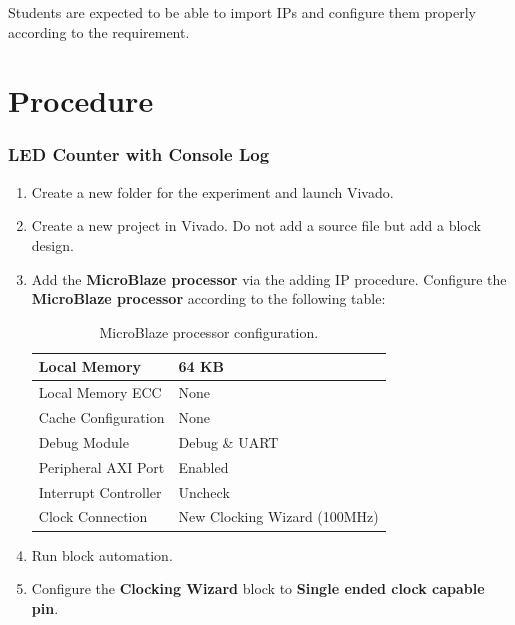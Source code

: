 \documentclass[11pt,letterpaper,titlepage]{article}
\begin{document}
Students are expected to be able to import IPs and configure them properly according to the requirement.

\part{Procedure}

\section{LED Counter with Console Log}

\begin{enumerate}
    \item Create a new folder for the experiment and launch Vivado.
    
    \item Create a new project in Vivado. Do not add a source file but add a block design.
    
    \item Add the \textbf{MicroBlaze processor} via the adding IP procedure. Configure the \textbf{MicroBlaze processor} according to the following table:
    
    \begin{table}[ht]
    \centering
    \begin{tabular}{@{}ll@{}}
    \toprule
    Local Memory         & 64 KB                        \\ \midrule
    Local Memory ECC     & None                         \\ \midrule
    Cache Configuration  & None                         \\ \midrule
    Debug Module         & Debug \& UART                \\ \midrule
    Peripheral AXI Port  & Enabled                      \\ \midrule
    Interrupt Controller & Uncheck                      \\ \midrule
    Clock Connection     & New Clocking Wizard (100MHz) \\ \bottomrule
    \end{tabular}
    \caption{MicroBlaze processor configuration.}
    \end{table}
    
    \item Run block automation.
    
    \item Configure the \textbf{Clocking Wizard} block to \textbf{Single ended clock capable pin}.
    

\end{enumerate}
\end{document}
